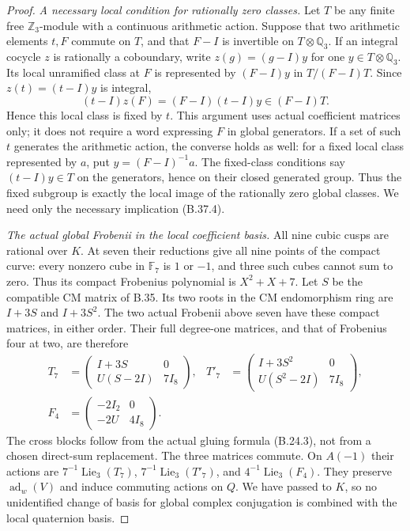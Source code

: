 \begin{proof}
\emph{A necessary local condition for rationally zero classes.}
Let $T$ be any finite free $\mathbb Z_3$-module with a
continuous arithmetic action. Suppose that two arithmetic
elements $t,F$ commute on $T$, and that $F-I$ is
invertible on $T\otimes\mathbb Q_3$.
If an integral cocycle $z$ is rationally a coboundary,
write $z(g)=(g-I)y$ for one
$y\in T\otimes\mathbb Q_3$. Its local unramified class
at $F$ is represented by $(F-I)y$ in $T/(F-I)T$.
Since $z(t)=(t-I)y$ is integral,
\[
 (t-I)z(F)=(F-I)(t-I)y\in(F-I)T.                            \tag{B.37.4}
\]
Hence this local class is fixed by $t$.
This argument uses actual coefficient matrices only;
it does not require a word expressing $F$ in global
generators. If a set of such $t$ generates the arithmetic
action, the converse holds as well: for a fixed local
class represented by $a$, put $y=(F-I)^{-1}a$.
The fixed-class conditions say $(t-I)y\in T$ on the
generators, hence on their closed generated group.
Thus the fixed subgroup is exactly the local image of
the rationally zero global classes. We need only the
necessary implication (B.37.4).

\emph{The actual global Frobenii in the local coefficient basis.}
All nine cubic cusps are rational over $K$. At seven
their reductions give all nine points of the compact
curve: every nonzero cube in $\mathbb F_7$ is $1$ or
$-1$, and three such cubes cannot sum to zero.
Thus its compact Frobenius polynomial is $X^2+X+7$.
Let $S$ be the compatible CM matrix of B.35. Its two
roots in the CM endomorphism ring are $I+3S$ and
$I+3S^2$. The two actual Frobenii above seven have these
compact matrices, in either order.
Their full degree-one matrices, and that of Frobenius
four at two, are therefore
\[
 \begin{aligned}
 T_7&=\begin{pmatrix}I+3S&0\\U(S-2I)&7I_8\end{pmatrix},
 &T'_7&=\begin{pmatrix}I+3S^2&0\\U(S^2-2I)&7I_8\end{pmatrix},\\
 F_4&=\begin{pmatrix}-2I_2&0\\-2U&4I_8\end{pmatrix}.
 \end{aligned}                                                \tag{B.37.5}
\]
The cross blocks follow from the actual gluing formula
(B.24.3), not from a chosen direct-sum replacement.
The three matrices commute. On $A(-1)$ their actions
are $7^{-1}\operatorname{Lie}_3(T_7)$,
$7^{-1}\operatorname{Lie}_3(T'_7)$, and
$4^{-1}\operatorname{Lie}_3(F_4)$.
They preserve $\operatorname{ad}_w(V)$ and induce
commuting actions on $Q$. We have passed to $K$, so
no unidentified change of basis for global complex
conjugation is combined with the local quaternion basis.


\end{proof}
